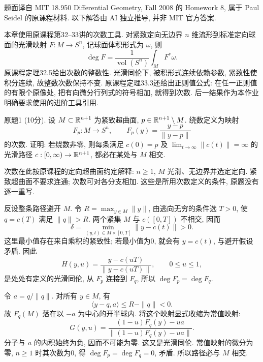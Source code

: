 \par{}
题面译自 MIT 18.950 Differential Geometry, Fall 2008 的 Homework 8, 属于 Paul Seidel 的原课程材料. 以下解答由 AI 独立推导, 并非 MIT 官方答案.

本章使用原课程第32--33讲的次数工具. 对紧致定向无边界 $n$ 维流形到标准定向球面的光滑映射 $F:M\to S^n$, 记球面体积形式为 $\omega$, 则
\[
 \deg F=\frac1{\operatorname{vol}(S^n)}\int_M F^*\omega.
\]
原课程定理32.5给出次数的整数性. 光滑同伦下, 被积形式连续依赖参数, 紧致性使积分连续, 故整数次数保持不变. 原课程定理33.3还给出正则值公式: 在任一正则值的有限个原像处, 把有向微分行列式的符号相加, 就得到次数. 后一结果作为本作业明确要求使用的进阶工具引用.

\par{}
\begin{exercise}\label{ps:8-1}
原题1 (10分). 设 $M\subset\mathbb R^{n+1}$ 为紧致超曲面, $p\in\mathbb R^{n+1}\setminus M$. 绕数定义为映射
\[
 F_p:M\longrightarrow S^n,\qquad F_p(y)=\frac{y-p}{\|y-p\|}
\]
的次数. 证明: 若绕数非零, 则每条满足 $c(0)=p$ 及 $\lim_{t\to\infty}\|c(t)\|=\infty$ 的光滑路径 $c:[0,\infty)\to\mathbb R^{n+1}$, 都必在某处与 $M$ 相交.
\end{exercise}
\begin{remark}
次数在此按原课程的定向超曲面约定解释: $n\ge1$, $M$ 光滑、无边界并选定定向. 紧致超曲面不要求连通; 次数可对各分支相加. 这些是所用次数定义的条件, 原题没有逐一重写.
\end{remark}
\begin{solution}
反设整条路径避开 $M$. 令 $R=\max_{y\in M}\|y\|$, 由逃向无穷的条件选 $T>0$, 使 $q=c(T)$ 满足 $\|q\|>R$. 两个紧集 $M$ 与 $c([0,T])$ 不相交, 因而
\[
 \delta=\min_{(y,t)\in M\times[0,T]}\|y-c(t)\|>0.
\]
这里最小值存在来自乘积的紧致性; 若最小值为0, 就会有 $y=c(t)$, 与避开假设矛盾. 因此
\[
 H(y,u)=\frac{y-c(uT)}{\|y-c(uT)\|},\qquad 0\le u\le1,
\]
是处处有定义的光滑同伦, 从 $F_p$ 连接到 $F_q$, 所以 $\deg F_p=\deg F_q$.

令 $a=q/\|q\|$. 对所有 $y\in M$, 有
\[
 \langle y-q,a\rangle\le R-\|q\|<0.
\]
故 $F_q(M)$ 落在以 $-a$ 为中心的开半球内. 将这个映射显式收缩为常值映射:
\[
 G(y,u)=\frac{(1-u)F_q(y)-ua}{\|(1-u)F_q(y)-ua\|}.
\]
分子与 $a$ 的内积始终为负, 因而不可能为零. 这又是光滑同伦. 常值映射的微分为零, $n\ge1$ 时其次数为0, 得 $\deg F_p=\deg F_q=0$, 矛盾. 所以路径必与 $M$ 相交.
\end{solution}

